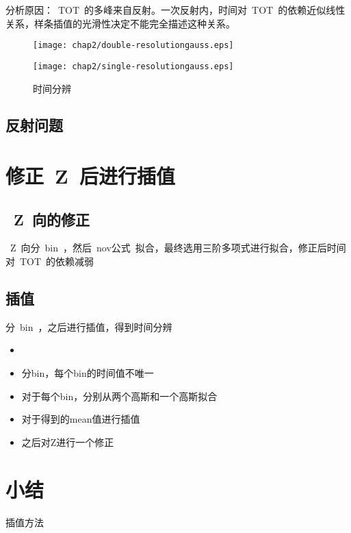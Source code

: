 分析原因：~TOT~的多峰来自反射。一次反射内，时间对~TOT~的依赖近似线性关系，样条插值的光滑性决定不能完全描述这种关系。
\begin{figure}[!h]
\begin{minipage}[!h]{0.5\linewidth}
\texttt{[image: chap2/double-resolutiongauss.eps]}
\label{fig:double-resolutiongauss}
\end{minipage}%
\hfill
\begin{minipage}[!h]{0.5\linewidth}
\texttt{[image: chap2/single-resolutiongauss.eps]}
\label{fig:single-resolutiongauss}
\end{minipage}
\caption{时间分辨}
\end{figure}

\subsection{反射问题}

\section{修正~Z~后进行插值}

\subsection{~Z~向的修正~}
~Z~向分~bin~，然后~nov公式~拟合，最终选用三阶多项式进行拟合，修正后时间对~TOT~的依赖减弱
\subsection{插值}
分~bin~，之后进行插值，得到时间分辨
\begin{itemize}
    \item 
    \item 分bin，每个bin的时间值不唯一
    \item 对于每个bin，分别从两个高斯和一个高斯拟合
    \item 对于得到的mean值进行插值
    \item 之后对Z进行一个修正
\end{itemize}

\section{小结}
插值方法
